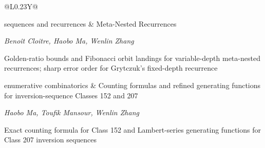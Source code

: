 \begin{table}[htbp]
\begin{tabularx}{\linewidth}{@{}L{0.23\linewidth}Y@{}}
\par sequences and recurrences & Meta-Nested Recurrences\par\emph{Beno\^{i}t Cloitre, Haobo Ma, Wenlin Zhang}\par\smallskip Golden-ratio bounds and Fibonacci orbit landings for variable-depth meta-nested recurrences; sharp error order for Grytczuk's fixed-depth recurrence \\[8pt]
\par enumerative combinatorics & Counting formulas and refined generating functions for inversion-sequence Classes 152 and 207\par\emph{Haobo Ma, Toufik Mansour, Wenlin Zhang}\par\smallskip Exact counting formula for Class 152 and Lambert-series generating functions for Class 207 inversion sequences \\[8pt]
\bottomrule\end{tabularx}
\end{table}
